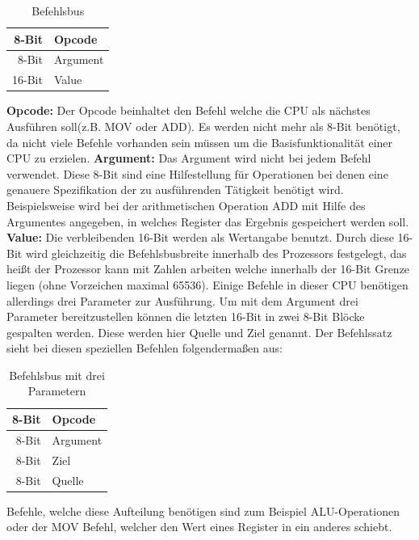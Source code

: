 \documentclass[12pt]{article}
\begin{document}
\begin{table}[!htb]
\centering
\caption{Befehlsbus}
\label{Befehlsbus}
\begin{tabular}{|r|l|}
  \hline
  8-Bit & Opcode \\
  \hline
  8-Bit & Argument \\ 
  \hline
  16-Bit & Value\\
  \hline
  
\end{tabular}
\end{table}

\indent
\textbf{Opcode: } Der Opcode beinhaltet den Befehl welche die CPU als nächstes Ausführen soll(z.B. MOV oder ADD). Es werden nicht mehr als 8-Bit benötigt, da nicht viele Befehle vorhanden sein müssen um die Basisfunktionalität einer CPU zu erzielen.
\newline
\indent
\textbf{Argument: } Das Argument wird nicht bei jedem Befehl verwendet. Diese 8-Bit sind eine Hilfestellung für Operationen bei denen eine genauere Spezifikation der zu ausführenden Tätigkeit benötigt wird. Beispielsweise wird bei der arithmetischen Operation ADD mit Hilfe des Argumentes angegeben, in welches Register das Ergebnis gespeichert werden soll.
\newline
\indent
\textbf{Value: } Die verbleibenden 16-Bit werden als Wertangabe benutzt. Durch diese 16-Bit wird gleichzeitig die Befehlsbusbreite innerhalb des Prozessors festgelegt, das heißt der Prozessor kann mit Zahlen arbeiten welche innerhalb der 16-Bit Grenze liegen (ohne Vorzeichen maximal 65536). Einige Befehle in dieser CPU benötigen allerdings drei Parameter zur Ausführung. Um mit dem Argument drei Parameter bereitzustellen können die letzten 16-Bit in zwei 8-Bit Blöcke gespalten werden. Diese werden hier Quelle und Ziel genannt. Der Befehlssatz sieht bei diesen speziellen Befehlen folgendermaßen aus: 
\begin{table}[!htb]
\centering
\caption{Befehlsbus mit drei Parametern}
\label{Befehlsbus3P}
\begin{tabular}{|r|l|}
  \hline
  8-Bit & Opcode \\
  \hline
  8-Bit & Argument \\ 
  \hline
  8-Bit & Ziel\\
  \hline
  8-Bit & Quelle\\
  \hline
\end{tabular}
\end{table}
\newline
Befehle, welche diese Aufteilung benötigen sind zum Beispiel ALU-Operationen oder der MOV Befehl, welcher den Wert eines Register in ein anderes schiebt.
\end{document}
